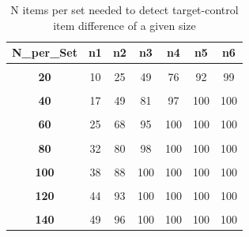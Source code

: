 \documentclass{krantz}
\begin{document}
\begin{table}

\caption{\label{tab:Nitems-power}N items per set needed to detect target-control item difference of a given size}
\centering
\begin{tabular}[t]{>{}ccccccc}
\toprule
N\_per\_Set & n1 & n2 & n3 & n4 & n5 & n6\\
\midrule
\textbf{\cellcolor{gray!6}{10}} & \cellcolor{gray!6}{6} & \cellcolor{gray!6}{13} & \cellcolor{gray!6}{24} & \cellcolor{gray!6}{43} & \cellcolor{gray!6}{64} & \cellcolor{gray!6}{81}\\
\textbf{20} & 10 & 25 & 49 & 76 & 92 & 99\\
\textbf{\cellcolor{gray!6}{30}} & \cellcolor{gray!6}{14} & \cellcolor{gray!6}{37} & \cellcolor{gray!6}{70} & \cellcolor{gray!6}{92} & \cellcolor{gray!6}{99} & \cellcolor{gray!6}{100}\\
\textbf{40} & 17 & 49 & 81 & 97 & 100 & 100\\
\textbf{\cellcolor{gray!6}{50}} & \cellcolor{gray!6}{20} & \cellcolor{gray!6}{58} & \cellcolor{gray!6}{89} & \cellcolor{gray!6}{100} & \cellcolor{gray!6}{100} & \cellcolor{gray!6}{100}\\
\addlinespace
\textbf{60} & 25 & 68 & 95 & 100 & 100 & 100\\
\textbf{\cellcolor{gray!6}{70}} & \cellcolor{gray!6}{30} & \cellcolor{gray!6}{73} & \cellcolor{gray!6}{97} & \cellcolor{gray!6}{100} & \cellcolor{gray!6}{100} & \cellcolor{gray!6}{100}\\
\textbf{80} & 32 & 80 & 98 & 100 & 100 & 100\\
\textbf{\cellcolor{gray!6}{90}} & \cellcolor{gray!6}{35} & \cellcolor{gray!6}{85} & \cellcolor{gray!6}{100} & \cellcolor{gray!6}{100} & \cellcolor{gray!6}{100} & \cellcolor{gray!6}{100}\\
\textbf{100} & 38 & 88 & 100 & 100 & 100 & 100\\
\addlinespace
\textbf{\cellcolor{gray!6}{110}} & \cellcolor{gray!6}{39} & \cellcolor{gray!6}{90} & \cellcolor{gray!6}{100} & \cellcolor{gray!6}{100} & \cellcolor{gray!6}{100} & \cellcolor{gray!6}{100}\\
\textbf{120} & 44 & 93 & 100 & 100 & 100 & 100\\
\textbf{\cellcolor{gray!6}{130}} & \cellcolor{gray!6}{47} & \cellcolor{gray!6}{94} & \cellcolor{gray!6}{100} & \cellcolor{gray!6}{100} & \cellcolor{gray!6}{100} & \cellcolor{gray!6}{100}\\
\textbf{140} & 49 & 96 & 100 & 100 & 100 & 100\\

\end{tabular}
\end{table}
\end{document}
